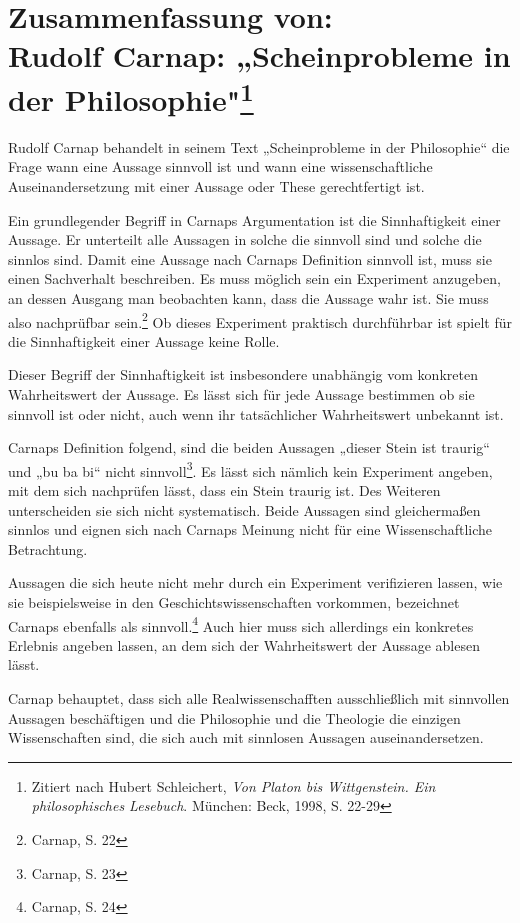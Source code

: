 

\fancyhead[L]{}
\fancyhead[C]{}
\fancyhead[R]{}


\section*{Zusammenfassung von:\\Rudolf Carnap: „Scheinprobleme in der Philosophie"\footnote{Zitiert nach Hubert Schleichert, \textit{Von Platon bis Wittgenstein. Ein philosophisches Lesebuch}. München: Beck, 1998, S. 22-29}}
Rudolf Carnap behandelt in seinem Text „Scheinprobleme in der Philosophie“ die Frage wann eine Aussage sinnvoll ist und wann eine wissenschaftliche Auseinandersetzung mit einer Aussage oder These gerechtfertigt ist. 

Ein grundlegender Begriff in Carnaps Argumentation ist die Sinnhaftigkeit einer Aussage. Er unterteilt alle Aussagen in solche die sinnvoll sind und solche die sinnlos sind. Damit eine Aussage nach Carnaps Definition sinnvoll ist, muss sie einen Sachverhalt beschreiben. Es muss möglich sein ein Experiment anzugeben, an dessen Ausgang man beobachten kann, dass die Aussage wahr ist. Sie muss also nachprüfbar sein.\footnote{Carnap, S. 22} Ob dieses Experiment praktisch durchführbar ist spielt für die Sinnhaftigkeit einer Aussage keine Rolle. 

Dieser Begriff der Sinnhaftigkeit ist insbesondere unabhängig vom konkreten Wahrheitswert der Aussage. Es lässt sich für jede Aussage bestimmen ob sie sinnvoll ist oder nicht, auch wenn ihr tatsächlicher Wahrheitswert unbekannt ist. 

Carnaps Definition folgend, sind die beiden Aussagen „dieser Stein ist traurig“ und „bu ba bi“ nicht sinnvoll\footnote{Carnap, S. 23}. Es lässt sich nämlich kein Experiment angeben, mit dem sich nachprüfen lässt, dass ein Stein traurig ist. Des Weiteren unterscheiden sie sich nicht systematisch. Beide Aussagen sind gleichermaßen sinnlos und eignen sich nach Carnaps Meinung nicht für eine Wissenschaftliche Betrachtung.

Aussagen die sich heute nicht mehr durch ein Experiment verifizieren lassen, wie sie beispielsweise in den Geschichtswissenschaften vorkommen, bezeichnet Carnaps ebenfalls als sinnvoll.\footnote{Carnap, S. 24} Auch hier muss sich allerdings ein konkretes Erlebnis angeben lassen, an dem sich der Wahrheitswert der Aussage ablesen lässt. 

Carnap behauptet, dass sich alle Realwissenschafften ausschließlich mit sinnvollen Aussagen beschäftigen und die Philosophie und die Theologie die einzigen Wissenschaften sind, die sich auch mit sinnlosen Aussagen auseinandersetzen.

